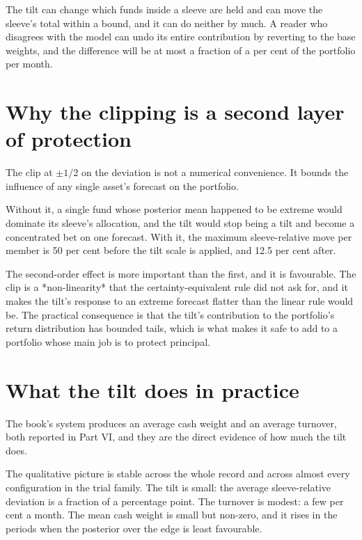 \begin{takeaway}
The tilt can change which funds inside a sleeve are held and can move the
sleeve's total within a bound, and it can do neither by much. A reader
who disagrees with the model can undo its entire contribution by
reverting to the base weights, and the difference will be at most a
fraction of a per cent of the portfolio per month.
\end{takeaway}

\section{Why the clipping is a second layer of protection}

The clip at \(\pm 1/2\) on the deviation is not a numerical convenience.
It bounds the influence of any single asset's forecast on the portfolio.

Without it, a single fund whose posterior mean happened to be extreme
would dominate its sleeve's allocation, and the tilt would stop being a
tilt and become a concentrated bet on one forecast. With it, the maximum
sleeve-relative move per member is 50 per cent before the tilt scale is
applied, and 12.5 per cent after.

The second-order effect is more important than the first, and it is
favourable. The clip is a *non-linearity* that the certainty-equivalent
rule did not ask for, and it makes the tilt's response to an extreme
forecast flatter than the linear rule would be. The practical consequence
is that the tilt's contribution to the portfolio's return distribution has
bounded tails, which is what makes it safe to add to a portfolio whose
main job is to protect principal.

\section{What the tilt does in practice}

The book's system produces an average cash weight and an average turnover,
both reported in Part VI, and they are the direct evidence of how much the
tilt does.

The qualitative picture is stable across the whole record and across
almost every configuration in the trial family. The tilt is small: the
average sleeve-relative deviation is a fraction of a percentage point.
The turnover is modest: a few per cent a month. The mean cash weight is
small but non-zero, and it rises in the periods when the posterior over
the edge is least favourable.

